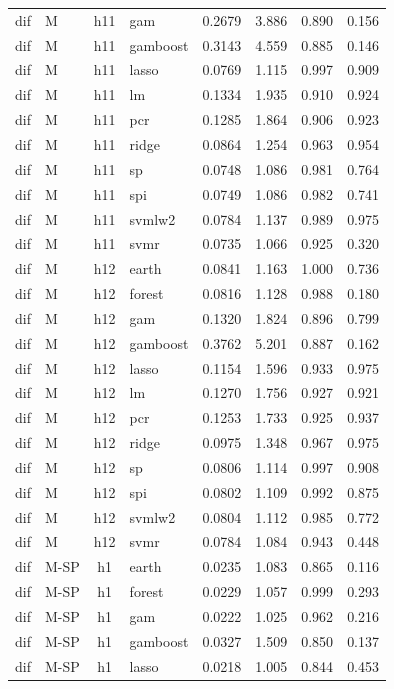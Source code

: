 \begin{ThreePartTable}
\begin{longtable}[t]{llclcccc}
dif & M & h11 & gam & 0.2679 & 3.886 & 0.890 & 0.156\\
dif & M & h11 & gamboost & 0.3143 & 4.559 & 0.885 & 0.146\\
dif & M & h11 & lasso & 0.0769 & 1.115 & 0.997 & 0.909\\
dif & M & h11 & lm & 0.1334 & 1.935 & 0.910 & 0.924\\
dif & M & h11 & pcr & 0.1285 & 1.864 & 0.906 & 0.923\\
dif & M & h11 & ridge & 0.0864 & 1.254 & 0.963 & 0.954\\
dif & M & h11 & sp & 0.0748 & 1.086 & 0.981 & 0.764\\
dif & M & h11 & spi & 0.0749 & 1.086 & 0.982 & 0.741\\
dif & M & h11 & svmlw2 & 0.0784 & 1.137 & 0.989 & 0.975\\
dif & M & h11 & svmr & 0.0735 & 1.066 & 0.925 & 0.320\\
\addlinespace
dif & M & h12 & earth & 0.0841 & 1.163 & 1.000 & 0.736\\
dif & M & h12 & forest & 0.0816 & 1.128 & 0.988 & 0.180\\
dif & M & h12 & gam & 0.1320 & 1.824 & 0.896 & 0.799\\
dif & M & h12 & gamboost & 0.3762 & 5.201 & 0.887 & 0.162\\
dif & M & h12 & lasso & 0.1154 & 1.596 & 0.933 & 0.975\\
dif & M & h12 & lm & 0.1270 & 1.756 & 0.927 & 0.921\\
dif & M & h12 & pcr & 0.1253 & 1.733 & 0.925 & 0.937\\
dif & M & h12 & ridge & 0.0975 & 1.348 & 0.967 & 0.975\\
dif & M & h12 & sp & 0.0806 & 1.114 & 0.997 & 0.908\\
dif & M & h12 & spi & 0.0802 & 1.109 & 0.992 & 0.875\\
dif & M & h12 & svmlw2 & 0.0804 & 1.112 & 0.985 & 0.772\\
dif & M & h12 & svmr & 0.0784 & 1.084 & 0.943 & 0.448\\
\addlinespace
dif & M-SP & h1 & earth & 0.0235 & 1.083 & 0.865 & 0.116\\
dif & M-SP & h1 & forest & 0.0229 & 1.057 & 0.999 & 0.293\\
dif & M-SP & h1 & gam & 0.0222 & 1.025 & 0.962 & 0.216\\
dif & M-SP & h1 & gamboost & 0.0327 & 1.509 & 0.850 & 0.137\\
dif & M-SP & h1 & lasso & 0.0218 & 1.005 & 0.844 & 0.453\\

\end{longtable}
\end{ThreePartTable}
